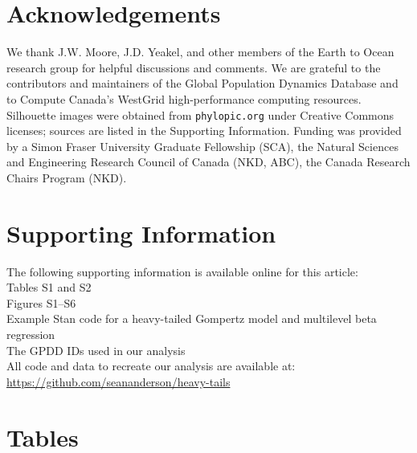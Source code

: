 \section{Acknowledgements}

We thank J.W. Moore, J.D. Yeakel, and other members of the Earth to Ocean
research group for helpful discussions and comments. We are grateful to the
contributors and maintainers of the Global Population Dynamics Database and to
Compute Canada's WestGrid high-performance computing resources. Silhouette
images were obtained from \texttt{phylopic.org} under Creative Commons
licenses; sources are listed in the Supporting Information. Funding was
provided by a Simon Fraser University Graduate Fellowship (SCA), the Natural
Sciences and Engineering Research Council of Canada (NKD, ABC), the Canada
Research Chairs Program (NKD).

\section{Supporting Information}

The following supporting information is available online for this article:\\
Tables S1 and S2\\
Figures S1--S6\\
Example Stan code for a heavy-tailed Gompertz model and multilevel beta
regression\\
The GPDD IDs used in our analysis\\
All code and data to recreate our analysis are available at:\\
\url{https://github.com/seananderson/heavy-tails}

\renewcommand{\baselinestretch}{\tighttextstretch}
\normalsize



\clearpage
\renewcommand{\baselinestretch}{\textstretch}
\normalsize

\section{Tables}



\clearpage

